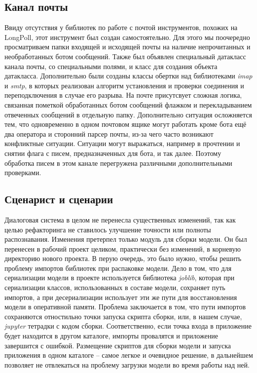     \subsection{Канал почты}
    Ввиду отсутствия у библиотек по работе с почтой инструментов, похожих на LongPoll, этот инструмент был
    создан самостоятельно. Для этого мы поочередно просматриваем папки входящей и исходящей почты на наличие
    непрочитанных и необработанных ботом сообщений. Также был объявлен специальный датакласс 
    канала почты, со специальными полями, и класс  для создания объекта датакласса.
    Дополнительно были созданы классы обертки над библиотеками \textit{imap} и \textit{smtp}, в которых
    реализован алгоритм установления и проверки соединения и переподключения в случае его разрыва.
    На почте присутсвует сложная логика, связанная пометкой обработанных ботом сообщений флажком
    и перекладыванием отвеченных сообщений в отдельную папку. Дополнительно ситуация осложняется тем, что
    одновременно в одном почтовом ящике могут работать кроме бота ещё два оператора и сторонний парсер почты,
    из-за чего часто возникают конфликтные ситуации. Ситуации могут выражаться, например в прочтении и снятии флага
     с писем, предназначенных для бота, и так далее. Поэтому обработка писем в этом канале перегружена
    различными дополнительными проверками.

    \subsection{Сценарист и сценарии}
    Диалоговая система в целом не перенесла существенных изменений, так как целью рефакторинга не ставилось
    улучшение точности или полноты распознавания. Изменения претерпел только модуль для сборки модели.
    Он был перенесен в рабочий проект целиком, практически без изменений, в корневую директорию нового проекта.
    В перую очередь, это было нужно, чтобы решить проблему импортов библиотек при распаковке модели.
    Дело в том, что для сериализации модели в проекте используется библиотека \textit{joblib}, которая при сериализации
    классов, использованных в составе модели, сохраняет путь импортов, а при десериализации использует эти же пути
    для восстановления модели в оперативной памяти.
    Проблема заключается в том, что пути импортов сохраняются отностильно точки запуска скрипта сборки, или,
    в нашем случае, \textit{jupyter} тетрадки с кодом сборки. Соответственно, если точка входа в приложение
    будет находится в другом каталоге, импорты провалятся и приложение завершится с ошибкой.
    Размещение скриптов для сборки модели и запуска приложения в одном каталоге -- самое легкое и очевидное
    решение, в дальнейшем позволяет не отвлекаться на проблему загрузки модели во время работы над ней.

